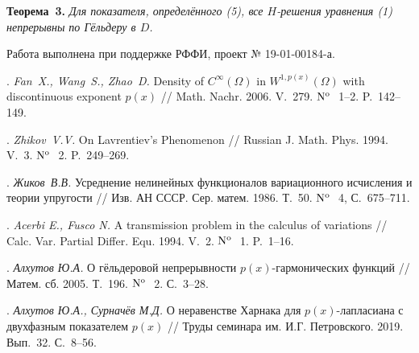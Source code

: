 \textbf{Теорема~3.} {\it Для показателя, определённого (5), все $H$-решения уравнения (1) непрерывны по Гёльдеру в $D$.}

\bigskip

Работа выполнена при поддержке РФФИ, проект № 19-01-00184-а.




\litlist

. {\it Fan~X., Wang~S., Zhao~D.} Density of $C^\infty(\Omega)$ in $W^{1,p(x)}(\Omega)$ with discontinuous exponent $p(x)$ // Math. Nachr. 2006. V.~279. ${\rm N^o}$\,~1--2. P.~142--149.

.  {\it Zhikov~V.V.} On Lavrentiev's Phenomenon // Russian J. Math. Phys. 1994. V.~3.  ${\rm N^o}$\,~2. P.~249--269.


. {\it Жиков~В.В.} Усреднение нелинейных функционалов вариационного исчисления и теории упругости // Изв. АН СССР.
Сер. матем. 1986. Т.~50. ${\rm N^o}$\,~4, С.~675--711.

. {\it Acerbi E., Fusco N.} A transmission problem in the calculus of variations // Calc. Var. Partial Differ. Equ. 1994. V.~2.  ${\rm N^o}$\,~1. P.~1--16.

. {\it Алхутов Ю.А.} О гёльдеровой непрерывности $p(x)$-гар\-мо\-ни\-ческих функций // Матем. сб. 2005. Т.~196. ${\rm N^o}$\,~2. С.~3--28.

. {\it Алхутов Ю.А., Сурначёв М.Д.} О неравенстве Харнака для $p(x)$-лапласиана с двухфазным показателем $p(x)$ // Труды семинара им. И.Г. Петровского. 2019. Вып.~32. С.~8--56.


